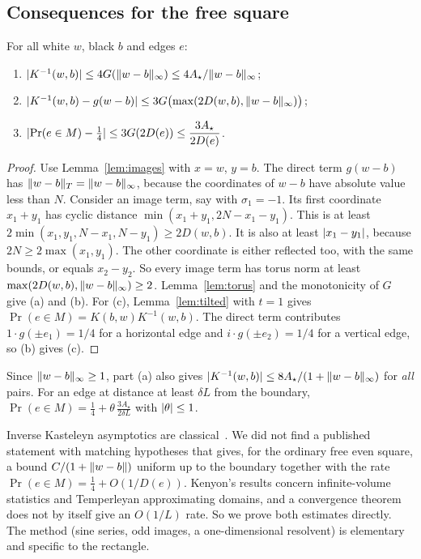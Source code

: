 \subsection{Consequences for the free square}

\begin{proposition}\label{prop:kernel}
For all white $w$, black $b$ and edges $e$:
\begin{enumerate}[label=(\alph*)]
\item $\lvert K^{-1}(w,b)\rvert\le4G(\lVert w-b\rVert_\infty)\le4A_\star/\lVert w-b\rVert_\infty$;
\item $\lvert K^{-1}(w,b)-g(w-b)\rvert\le3G\bigl(\max(2D(w,b),\lVert w-b\rVert_\infty)\bigr)$;
\item $\lvert \Pr(e\in M)-\frac14\rvert\le3G(2D(e))\le\dfrac{3A_\star}{2D(e)}$.
\end{enumerate}
\end{proposition}

\begin{proof}
Use Lemma~\ref{lem:images} with $x=w$, $y=b$. The direct term $g(w-b)$ has $\lVert w-b\rVert_T=\lVert w-b\rVert_\infty$, because the coordinates of $w-b$ have absolute value less than $N$. Consider an image term, say with $\sigma_1=-1$. Its first coordinate $x_1+y_1$ has cyclic distance $\min(x_1+y_1,2N-x_1-y_1)$. This is at least $2\min(x_1,y_1,N-x_1,N-y_1)\ge2D(w,b)$. It is also at least $\lvert x_1-y_1\rvert$, because $2N\ge2\max(x_1,y_1)$. The other coordinate is either reflected too, with the same bounds, or equals $x_2-y_2$. So every image term has torus norm at least $\max(2D(w,b),\lVert w-b\rVert_\infty)\ge2$. Lemma~\ref{lem:torus} and the monotonicity of $G$ give (a) and (b). For (c), Lemma~\ref{lem:tilted} with $t=1$ gives $\Pr(e\in M)=K(b,w)K^{-1}(w,b)$. The direct term contributes $1\cdot g(\pm e_1)=1/4$ for a horizontal edge and $i\cdot g(\pm e_2)=1/4$ for a vertical edge, so (b) gives (c).
\end{proof}

Since $\lVert w-b\rVert_\infty\ge1$, part (a) also gives $\lvert K^{-1}(w,b)\rvert\le8A_\star/(1+\lVert w-b\rVert_\infty)$ for \emph{all} pairs. For an edge at distance at least $\delta L$ from the boundary, $\Pr(e\in M)=\frac14+\theta\,\frac{3A_\star}{2\delta L}$ with $\lvert \theta\rvert\le1$.

\begin{remark}
Inverse Kasteleyn asymptotics are classical~\cite{Kenyon97,Kenyon00,KenyonLectures}. We did not find a published statement with matching hypotheses that gives, for the ordinary free even square, a bound $C/(1+\lVert w-b\rVert)$ uniform up to the boundary together with the rate $\Pr(e\in M)=\frac14+O(1/D(e))$. Kenyon's results concern infinite-volume statistics and Temperleyan approximating domains, and a convergence theorem does not by itself give an $O(1/L)$ rate. So we prove both estimates directly. The method (sine series, odd images, a one-dimensional resolvent) is elementary and specific to the rectangle.
\end{remark}

